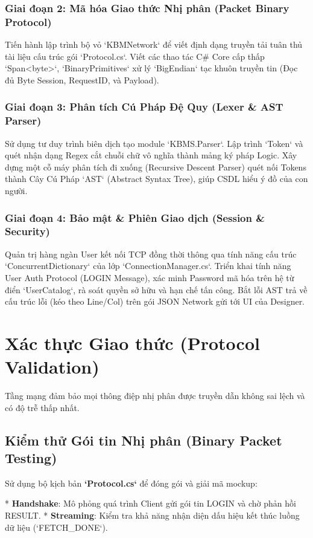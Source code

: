 \subsubsection{Giai đoạn 2: Mã hóa Giao thức Nhị phân (Packet Binary Protocol)}
Tiến hành lập trình bộ vỏ `KBMNetwork` để viết định dạng truyền tải tuân thủ tài liệu cấu trúc gói `Protocol.cs`. Viết các thao tác C\# Core cấp thấp `Span<byte>`, `BinaryPrimitives` xử lý `BigEndian` tạc khuôn truyền tin (Đọc đủ Byte Session, RequestID, và Payload).

\subsubsection{Giai đoạn 3: Phân tích Cú Pháp Đệ Quy (Lexer & AST Parser)}
Sử dụng tư duy trình biên dịch tạo module `KBMS.Parser`. Lập trình `Token` và quét nhận dạng Regex cắt chuỗi chữ vô nghĩa thành mảng ký pháp Logic. Xây dựng một cỗ máy phân tích đi xuống (Recursive Descent Parser) quét nối Tokens thành Cây Cú Pháp `AST` (Abstract Syntax Tree), giúp CSDL hiểu ý đồ của con người.

\subsubsection{Giai đoạn 4: Bảo mật & Phiên Giao dịch (Session & Security)}
Quản trị hàng ngàn User kết nối TCP đồng thời thông qua tính năng cấu trúc `ConcurrentDictionary` của lớp `ConnectionManager.cs`. Triển khai tính năng User Auth Protocol (LOGIN Message), xác minh Password mã hóa trên hệ từ điển `UserCatalog`, rà soát quyền sở hữu và hạn chế tấn công. Bắt lỗi AST trả về cấu trúc lỗi (kéo theo Line/Col) trên gói JSON Network gửi tới UI của Designer.

\section{Xác thực Giao thức (Protocol Validation)}

Tầng mạng đảm bảo mọi thông điệp nhị phân được truyền dẫn không sai lệch và có độ trễ thấp nhất.

\subsection{Kiểm thử Gói tin Nhị phân (Binary Packet Testing)}

Sử dụng bộ kịch bản \textbf{`Protocol.cs`} để đóng gói và giải mã mockup:

*   \textbf{Handshake}: Mô phỏng quá trình Client gửi gói tin LOGIN và chờ phản hồi RESULT.
*   \textbf{Streaming}: Kiểm tra khả năng nhận diện dấu hiệu kết thúc luồng dữ liệu (`FETCH\_DONE`).

